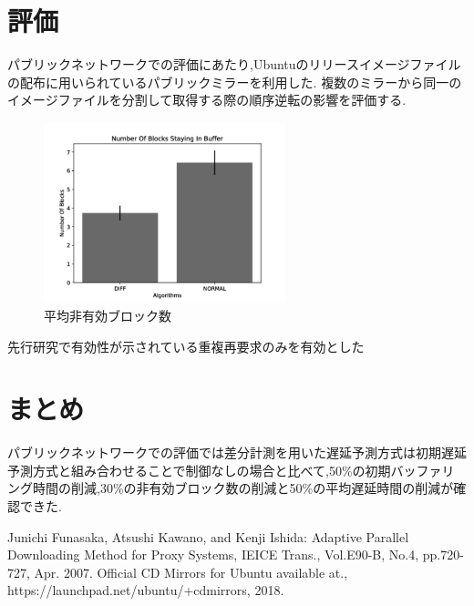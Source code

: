 \documentclass{ltjsarticle}
\begin{document}
\section{評価}
パブリックネットワークでの評価にあたり,Ubuntuのリリースイメージファイルの配布に用いられているパブリックミラー\cite{ubuntu}を利用した.
複数のミラーから同一のイメージファイルを分割して取得する際の順序逆転の影響を評価する.

\begin{figure}[ht]
	\centering
	\includegraphics[width=7cm]{figure/nsb-g.pdf}
	\caption{平均非有効ブロック数}
	\label{nsbpub}
\end{figure}
先行研究で有効性が示されている重複再要求のみを有効とした

\section{まとめ}
パブリックネットワークでの評価では差分計測を用いた遅延予測方式は初期遅延予測方式と組み合わせることで制御なしの場合と比べて,50\%の初期バッファリング時間の削減,30\%の非有効ブロック数の削減と50\%の平均遅延時間の削減が確認できた.

\begin{thebibliography}{2}
Junichi Funasaka, Atsushi Kawano, and Kenji Ishida: Adaptive Parallel Downloading Method for Proxy Systems, IEICE Trans., Vol.E90-B, No.4, pp.720-727, Apr. 2007.
Official CD Mirrors for Ubuntu available at., https://launchpad.net/ubuntu/+cdmirrors, 2018.
\end{thebibliography}
\end{document}
